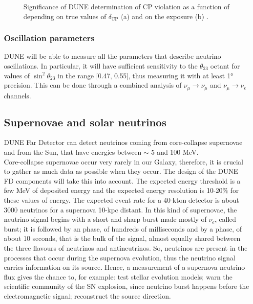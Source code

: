 \begin{figure}
    \centering
    \hfil
    \caption{Significance of DUNE determination of CP violation as a function of depending on true values of $\delta_{\text{CP}}$ (a) and on the exposure (b) \cite{dunecollaboration2022snowmass}.}
    \label{fig:CPV-plots}
\end{figure}

\subsubsection{Oscillation parameters}
DUNE will be able to measure all the parameters that describe neutrino oscillations. In particular, it will have sufficient sensitivity to the $\theta_{23}$ octant for values of $\sin^2\theta_{23}$ in the range [0.47, 0.55], thus measuring it with at least 1° precision. This can be done through a combined analysis of $\nu_{\mu} \rightarrow \nu_{\mu}$ and $\nu_{\mu} \rightarrow \nu_{e}$ channels.

\subsection{Supernovae and solar neutrinos}

\titleformat{\subsubsection}[runin]
  {\normalfont\normalsize\bfseries}{\thesubsubsection}{1em}{}

DUNE Far Detector can detect neutrinos coming from core-collapse supernovae and from the Sun, that have energies between $\sim$ 5 and 100 MeV. \\
Core-collapse supernovae occur very rarely in our Galaxy, therefore, it is crucial to gather as much data as possible when they occur. The design of the DUNE FD components will take this into account. The expected energy threshold is a few MeV of deposited energy and the expected energy resolution is 10-20\% for these values of energy. The expected event rate for a 40-kton detector is about 3000 neutrinos for a supernova 10-kpc distant.
In this kind of supernovae, the neutrino signal begins with a short and sharp burst made mostly of $\nu_e$, called  burst; it is followed by an  phase, of hundreds of milliseconds and by a  phase, of about 10 seconds, that is the bulk of the signal, almost equally shared between the three flavours of neutrinos and antineutrinos. So, neutrinos are present in the processes that occur during the supernova evolution, thus the neutrino signal carries information on its source. Hence, a measurement of a supernova neutrino flux gives the chance to, for example: test stellar evolution models; warn the scientific community of the SN explosion, since neutrino burst happens before the electromagnetic signal; reconstruct the source direction.

